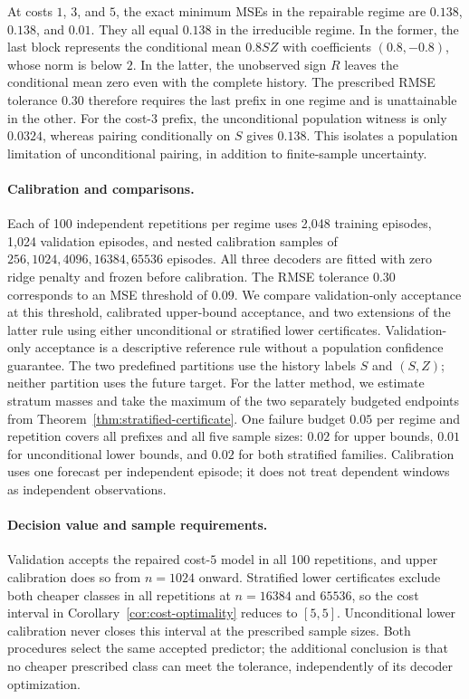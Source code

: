 At costs $1$, $3$, and $5$, the exact minimum MSEs in the repairable regime
are $0.138$, $0.138$, and $0.01$. They all equal $0.138$ in the irreducible
regime. In the former, the last
block represents the conditional mean $0.8SZ$ with coefficients
$(0.8,-0.8)$, whose norm is below $2$. In the latter, the unobserved sign $R$
leaves the conditional mean zero even with the complete history. The prescribed
RMSE tolerance $0.30$ therefore requires the last prefix in one regime and
is unattainable in the other. For the cost-$3$ prefix, the unconditional
population witness is only $0.0324$, whereas pairing conditionally on $S$
gives $0.138$. This isolates a population limitation of unconditional pairing,
in addition to finite-sample uncertainty.

\paragraph{Calibration and comparisons.}
Each of 100 independent repetitions per regime uses 2,048 training episodes,
1,024 validation episodes, and nested calibration samples of
$256,1024,4096,16384,65536$ episodes. All three decoders are fitted with zero
ridge penalty and frozen before calibration. The RMSE tolerance $0.30$
corresponds to an MSE threshold of $0.09$. We compare validation-only
acceptance at this threshold, calibrated upper-bound acceptance, and two
extensions of the latter rule using either unconditional or stratified
lower certificates.
Validation-only acceptance is a descriptive reference rule without a population
confidence guarantee. The two predefined partitions use the history labels
$S$ and $(S,Z)$; neither
partition uses the future target. For the latter method, we estimate
stratum masses and take the maximum of the two separately budgeted endpoints
from Theorem~\ref{thm:stratified-certificate}. One failure budget $0.05$ per
regime and repetition covers all prefixes and all five sample sizes:
$0.02$ for upper bounds, $0.01$ for unconditional lower bounds, and $0.02$
for both stratified families. Calibration uses one forecast per independent
episode; it does not treat dependent windows as independent observations.



\paragraph{Decision value and sample requirements.}
Validation accepts the repaired cost-$5$ model in all 100 repetitions, and
upper calibration does so from $n=1024$ onward. Stratified lower certificates
exclude both cheaper classes in all repetitions at $n=16384$ and $65536$,
so the cost interval in Corollary~\ref{cor:cost-optimality} reduces to
$[5,5]$. Unconditional lower calibration never closes this interval at the
prescribed sample sizes. Both procedures select the same accepted predictor;
the additional conclusion is that no cheaper prescribed class can meet the
tolerance, independently of its decoder optimization.


